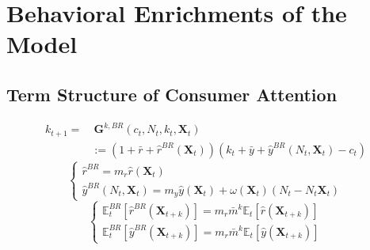 \documentclass{beamer}
\newcommand\ReduceFont{\fontsize{10}{7.2}\selectfont}
\begin{document}
\begin{frame}
    \tableofcontents[currentsection, hideothersubsections, sections=\value{section}]
\end{frame}

\section{Behavioral Enrichments of the Model}
\begin{frame}
    \ReduceFont
\end{frame}

\begin{frame}
    \tableofcontents[currentsection, hideothersubsections, sections=\value{section}]
\end{frame}

\subsection{Term Structure of Consumer Attention}
\begin{frame}{\subsecname}
    \begin{equation} \tag{49}
        \begin{split}
            k_{t+1}= &\  \textbf{G}^{k,BR}(c_{t},N_{t},k_{t},\textbf{X}_{t}) \\
            & := (1+\bar{r}+\hat{r}^{BR}(\textbf{X}_t))(k_{t}+\bar{y}+\hat{y}^{BR}(N_{t},\textbf{X}_t)-c_{t})
        \end{split}
    \end{equation}
    \begin{equation}\tag{50}
        \begin{cases}
            \hat{r}^{BR} = m_{r} \hat{r}(\textbf{X}_{t}) \\
            \hat{y}^{BR}(N_{t},\textbf{X}_{t}) = m_{y}\hat{y}(\textbf{X}_{t})+\omega(\textbf{X}_{t})(N_{t}-N_{t}\textbf{X}_{t})
        \end{cases}
    \end{equation}
    \begin{equation}\tag{51}
        \begin{cases}
            \mathbb{E}_{t}^{BR}\left[\hat{r}^{BR}(\textbf{X}_{t+k})\right]=m_{r}\bar{m}^{k}\mathbb{E}_{t}\left[\hat{r}(\textbf{X}_{t+k})\right] \\
            \mathbb{E}_{t}^{BR}\left[\hat{y}^{BR}(\textbf{X}_{t+k})\right]=m_{r}\bar{m}^{k}\mathbb{E}_{t}\left[\hat{y}(\textbf{X}_{t+k})\right]
        \end{cases}
    \end{equation}
\end{frame}
\end{document}
